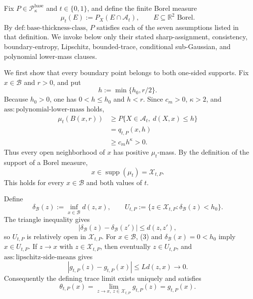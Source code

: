 Fix \(P\in\mathcal P_{\kappa}^{\mathrm{base}}\) and \(t\in\{0,1\}\), and define the finite Borel measure
\[
 \mu_t(E):=P_X(E\cap\mathcal A_t),
 \qquad E\subseteq\mathbb R^2\text{ Borel}.
 \tag{1}
\]
By \(\mathrm{def:base\text{-}thickness\text{-}class}\), \(P\) satisfies each of the seven assumptions listed in that definition. We invoke below only their stated sharp-assignment, consistency, boundary-entropy, Lipschitz, bounded-trace, conditional sub-Gaussian, and polynomial lower-mass clauses.

We first show that every boundary point belongs to both one-sided supports. Fix \(x\in\mathcal B\) and \(r>0\), and put
\[
 h:=\min\{h_0,r/2\}.
\]
Because \(h_0>0\), one has \(0<h\le h_0\) and \(h<r\). Since \(c_m>0\), \(\kappa>2\), and \(\mathrm{ass:polynomial\text{-}lower\text{-}mass}\) holds,
\[
 \begin{aligned}
 \mu_t(B(x,r))
 &\ge P\{X\in\mathcal A_t,\ d(X,x)\le h\}\\
 &=q_{t,P}(x,h)\\
 &\ge c_m h^\kappa>0.
 \end{aligned}
 \tag{2}
\]
Thus every open neighborhood of \(x\) has positive \(\mu_t\)-mass. By the definition of the support of a Borel measure,
\[
 x\in\operatorname{supp}(\mu_t)=\mathcal X_{t,P}.
 \tag{3}
\]
This holds for every \(x\in\mathcal B\) and both values of \(t\).

Define
\[
 \delta_{\mathcal B}(z):=\inf_{x\in\mathcal B}d(z,x),
 \qquad
 U_{t,P}:=\{z\in\mathcal X_{t,P}:\delta_{\mathcal B}(z)<h_0\}.
 \tag{4}
\]
The triangle inequality gives
\[
 |\delta_{\mathcal B}(z)-\delta_{\mathcal B}(z')|\le d(z,z'),
 \tag{5}
\]
so \(U_{t,P}\) is relatively open in \(\mathcal X_{t,P}\). For \(x\in\mathcal B\), (3) and \(\delta_{\mathcal B}(x)=0<h_0\) imply \(x\in U_{t,P}\). If \(z\to x\) with \(z\in\mathcal X_{t,P}\), then eventually \(z\in U_{t,P}\), and \(\mathrm{ass:lipschitz\text{-}side\text{-}means}\) gives
\[
 |g_{t,P}(z)-g_{t,P}(x)|\le Ld(z,x)\longrightarrow0.
\]
Consequently the defining trace limit exists uniquely and satisfies
\[
 \theta_{t,P}(x)
 =\lim_{z\to x,\ z\in\mathcal X_{t,P}}g_{t,P}(z)
 =g_{t,P}(x).
 \tag{6}
\]

